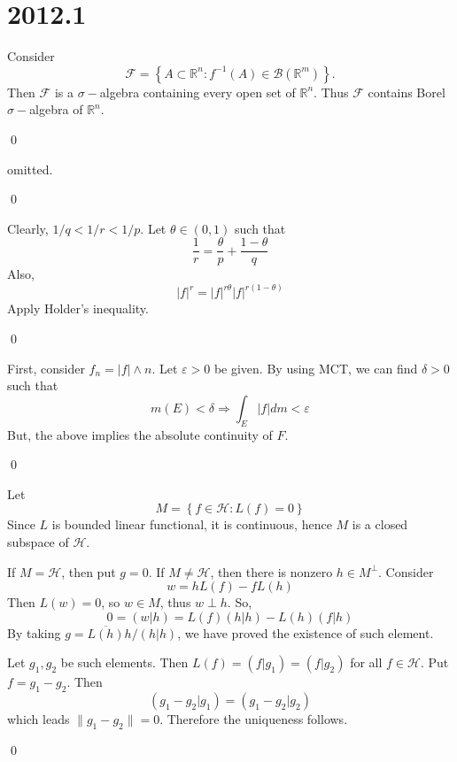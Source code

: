 \section*{2012.1}

\begin{problem}
	Consider
	\[
		\mathcal{F} = \left\{ A \subset \mathbb{R}^n : f^{-1}(A) \in \mathcal{B}(\mathbb{R}^m) \right\}.
	\]
	Then $\mathcal{F}$ is a $\sigma-$algebra containing every open set of $\mathbb{R}^n$.
	Thus $\mathcal{F}$ contains Borel $\sigma-$algebra of $\mathbb{R}^n$.

	\qed
\end{problem}

\begin{problem}
	omitted.

	\qed
\end{problem}

\begin{problem}
	Clearly, $1/q < 1/r < 1/p$.
	Let $\theta \in (0, 1)$ such that
	\[
		\frac{1}{r} = \frac{\theta}{p} + \frac{1-\theta}{q}
	\]
	Also,
	\[
		|f|^r = |f|^{r\theta}|f|^{r(1-\theta)}
	\]
	Apply Holder's inequality.

	\qed
\end{problem}

\begin{problem}
	First, consider $f_n = |f| \wedge n$.
	Let $\varepsilon >0$ be given.
	By using MCT, we can find $\delta >0$ such that
	\[
		m(E) < \delta \Rightarrow \int_E |f| dm < \varepsilon
	\]
	But, the above implies the absolute continuity of $F$.

	\qed
\end{problem}

\begin{problem}
	Let
	\[
		M = \left\{ f \in \mathcal{H}: L(f) = 0 \right\}
	\]
	Since $L$ is bounded linear functional, it is continuous, hence $M$ is a closed subspace of $\mathcal{H}$.
	
	If $M = \mathcal{H}$, then put $g = 0$.
	If $M \ne \mathcal{H}$, then there is nonzero $h \in M^\perp$.
	Consider 
	\[
		w = h L(f) - f L(h)
	\]
	Then $L(w) = 0$, so $w \in M$, thus $w \perp h$.
	So,
	\[
		0 = (w|h) = L(f)(h|h) - L(h)(f|h)
	\]
	By taking $g = \overline{L(h)}h/(h|h)$, we have proved the existence of such element.

	Let $g_1, g_2$ be such elements. Then $L(f) = (f|g_1) = (f|g_2)$ for all $f \in \mathcal{H}$.
	Put $f = g_1 - g_2$.
	Then
	\[
		(g_1 - g_2|g_1) = (g_1 - g_2|g_2)
	\]
	which leads $\| g_1 - g_2 \| = 0$.
	Therefore the uniqueness follows.

	\qed
\end{problem}

